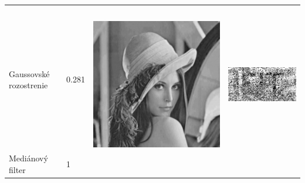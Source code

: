 \begin{table}[h]
\begin{tabular}{llcc}
\begin{minipage}[c]{.15\textwidth}
\end{minipage} \\
Gaussovské rozostrenie                 & 0.281 &
\begin{minipage}[c]{.1\textwidth}
\ 
  \includegraphics[scale=0.1]{obrazky/gaussianBlur}
\end{minipage} &
\begin{minipage}[c]{.15\textwidth}
\ 
  \includegraphics[scale=0.25]{obrazky/gaussianBlur-wm}
\end{minipage} \\
Mediánový filter                       &  1 &
\begin{minipage}[c]{.1\textwidth}
\ 

\end{minipage}
\end{tabular}
\end{table}
